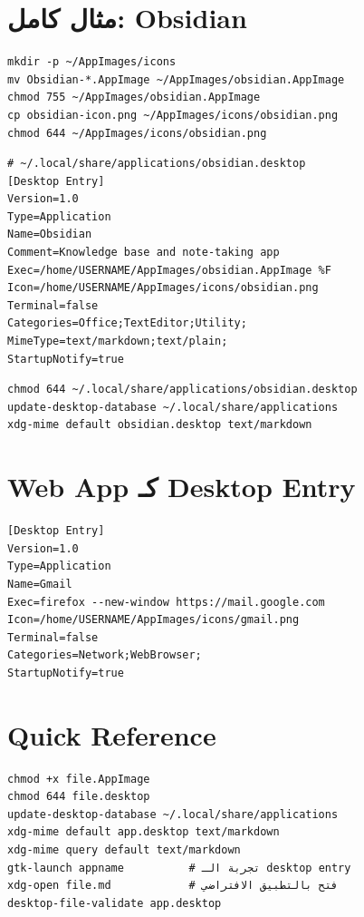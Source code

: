 \documentclass[12pt, a4paper]{report}
\begin{document}
\section{مثال كامل: Obsidian}
\begin{lstlisting}
mkdir -p ~/AppImages/icons
mv Obsidian-*.AppImage ~/AppImages/obsidian.AppImage
chmod 755 ~/AppImages/obsidian.AppImage
cp obsidian-icon.png ~/AppImages/icons/obsidian.png
chmod 644 ~/AppImages/icons/obsidian.png
\end{lstlisting}

\begin{lstlisting}[style=inistyle]
# ~/.local/share/applications/obsidian.desktop
[Desktop Entry]
Version=1.0
Type=Application
Name=Obsidian
Comment=Knowledge base and note-taking app
Exec=/home/USERNAME/AppImages/obsidian.AppImage %F
Icon=/home/USERNAME/AppImages/icons/obsidian.png
Terminal=false
Categories=Office;TextEditor;Utility;
MimeType=text/markdown;text/plain;
StartupNotify=true
\end{lstlisting}

\begin{lstlisting}
chmod 644 ~/.local/share/applications/obsidian.desktop
update-desktop-database ~/.local/share/applications
xdg-mime default obsidian.desktop text/markdown
\end{lstlisting}

\section{Web App كـ Desktop Entry}
\begin{lstlisting}[style=inistyle]
[Desktop Entry]
Version=1.0
Type=Application
Name=Gmail
Exec=firefox --new-window https://mail.google.com
Icon=/home/USERNAME/AppImages/icons/gmail.png
Terminal=false
Categories=Network;WebBrowser;
StartupNotify=true
\end{lstlisting}

\section{Quick Reference}
\begin{lstlisting}
chmod +x file.AppImage
chmod 644 file.desktop
update-desktop-database ~/.local/share/applications
xdg-mime default app.desktop text/markdown
xdg-mime query default text/markdown
gtk-launch appname          # تجربة الـ desktop entry
xdg-open file.md            # فتح بالتطبيق الافتراضي
desktop-file-validate app.desktop
\end{lstlisting}
\end{document}
